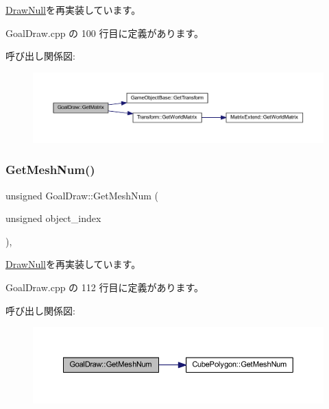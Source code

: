 \mbox{\hyperlink{class_draw_null_adede079e9c11a756090740b20bb43022}{Draw\+Null}}を再実装しています。



 Goal\+Draw.\+cpp の 100 行目に定義があります。

呼び出し関係図\+:\nopagebreak
\begin{figure}[H]
\begin{center}
\leavevmode
\includegraphics[width=350pt]{class_goal_draw_a50fa9ceaaecdff9910e0f91e65ad9e95_cgraph}
\end{center}
\end{figure}
\mbox{\label{class_goal_draw_a7f30c7a4325668eebd8730ad2bea1ad8}} 
\subsubsection{\texorpdfstring{Get\+Mesh\+Num()}{GetMeshNum()}}
{\footnotesize\ttfamily unsigned Goal\+Draw\+::\+Get\+Mesh\+Num (\begin{DoxyParamCaption}\item[{unsigned}]{object\+\_\+index }\end{DoxyParamCaption})\hspace{0.3cm}{\ttfamily [override]}, {\ttfamily [virtual]}}



\mbox{\hyperlink{class_draw_null_ad735978a85a5f3583eecd82d6bfe6413}{Draw\+Null}}を再実装しています。



 Goal\+Draw.\+cpp の 112 行目に定義があります。

呼び出し関係図\+:\nopagebreak
\begin{figure}[H]
\begin{center}
\leavevmode
\includegraphics[width=350pt]{class_goal_draw_a7f30c7a4325668eebd8730ad2bea1ad8_cgraph}
\end{center}
\end{figure}
\mbox{\label{class_goal_draw_a3eb0a555fa2db9d2c1253018ea65796e}} 
